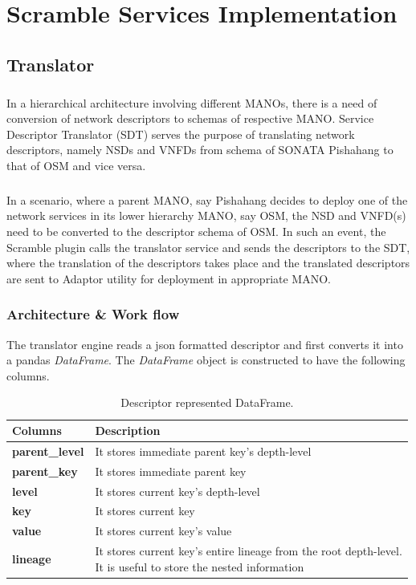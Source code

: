 \chapter{Scramble Services Implementation}
\label{ch:WP}

\section{Translator}
\paragraph{}
In a hierarchical architecture involving different MANOs, there is a need of conversion of network descriptors to schemas of respective MANO. Service Descriptor Translator (SDT) serves the purpose of translating network descriptors, namely NSDs and VNFDs from schema of SONATA Pishahang to that of OSM and vice versa.
\paragraph{}
In a scenario, where a parent MANO, say Pishahang decides to deploy one of the network services in its lower hierarchy MANO, say OSM, the NSD and VNFD(s) need to be converted to the descriptor schema of OSM. In such an event, the Scramble plugin calls the translator service and sends the descriptors to the SDT, where the translation of the descriptors takes place and the translated descriptors are sent to Adaptor utility for deployment in appropriate MANO. 


\subsection{Architecture \& Work flow}
The translator engine reads a json formatted descriptor and first converts it into a pandas \textit{DataFrame}. The \textit{DataFrame} object is constructed to have the following columns.

\begin{table}[H]
	\begin{center}
		\caption{Descriptor represented DataFrame.}
		\label{tab:table1}
		\begin{tabular}{l|l} 
			\textbf{Columns} & \textbf{Description} \\
			\hline
			\textbf{parent\_level} & It stores immediate parent key's depth-level \\ 
			\textbf{parent\_key} & It stores immediate parent key  \\
			\textbf{level} & It stores current key's depth-level \\
			\textbf{key} & It stores current key \\
			\textbf{value} & It stores current key's value \\
			\textbf{lineage} & \makecell[l]{It stores current key's entire lineage from the root depth-level.\\ It is useful to store the nested information} \\  
		\end{tabular}
	\end{center}
\end{table}

